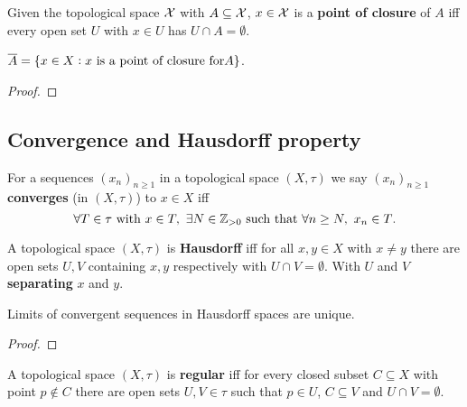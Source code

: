 \documentclass[../Year2.tex]{subfiles}
\begin{document}
\begin{definition}
    Given the topological space $\mathcal{X}$ with $A\subseteq\mathcal{X}$, $x\in\mathcal{X}$ is a \textbf{point of closure} of $A$ iff every open set $U$ with $x\in U$ has $U\cap A=\emptyset$.
\end{definition}

\begin{proposition}
    $\overline{A}=\{x\in X: x \ \text{\textcolor{black}{is a point of closure for}} A\}$.
    \begin{proof}
        
    \end{proof}
\end{proposition}

\subsection{Convergence and Hausdorff property}

\begin{definition}[Convergence]
    For a sequences ${(x_n)}_{n\geq 1}$ in a topological space $(X,\tau)$ we say ${(x_n)}_{n\geq 1}$ \textbf{converges} (in $(X,\tau)$) to $x\in X$ iff \[
        \forall T\in\tau \ \black{with } x\in T, \ \exists N\in\ZZ_{>0} \ \black{such that } \forall n\geq N, \ x_n\in T\black{.}
    \]\vspace{-20pt}
\end{definition}

\begin{definition}[Hausdorff]
    A topological space $(X,\tau)$ is \textbf{Hausdorff} iff for all $x,y\in X$ with $x\neq y$ there are open sets $U,V$ containing $x,y$ respectively with $U\cap V=\emptyset$. With $U$ and $V$ \textbf{separating} $x$ and $y$.
\end{definition}

\begin{theorem}
    Limits of convergent sequences in Hausdorff spaces are unique.
    \begin{proof}
        
    \end{proof}
\end{theorem}

\begin{definition}
    A topological space $(X,\tau)$ is \textbf{regular} iff for every closed subset $C\subseteq X$ with point $p\not\in C$ there are open sets $U,V\in\tau$ such that $p\in U$, $C\subseteq V$ and $U\cap V=\emptyset$.
\end{definition}
\end{document}
